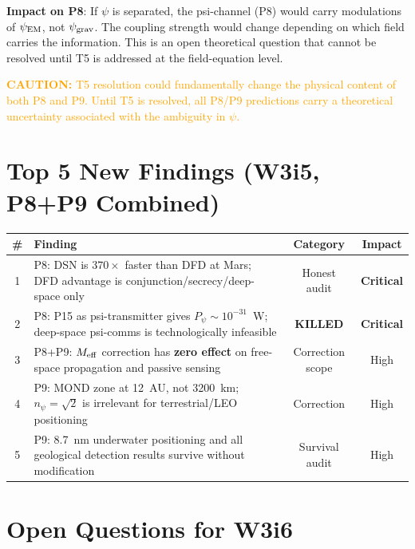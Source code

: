 \documentclass[aps,prd,twocolumn,superscriptaddress,nofootinbib]{revtex4-2}
\newcommand{\caution}[1]{\textcolor{orange}{\textbf{CAUTION:} #1}}
\begin{document}
\textbf{Impact on P8}: If $\psi$ is separated, the psi-channel (P8) would
carry modulations of $\psi_{\rm EM}$, not $\psi_{\rm grav}$. The
coupling strength would change depending on which field carries the
information. This is an open theoretical question that cannot be
resolved until T5 is addressed at the field-equation level.

\caution{T5 resolution could fundamentally change the physical content
of both P8 and P9. Until T5 is resolved, all P8/P9 predictions carry
a theoretical uncertainty associated with the ambiguity in $\psi$.}

\section{Top 5 New Findings (W3i5, P8+P9 Combined)}
\label{sec:top5}

\begin{center}
\begin{tabular}{clcc}
\toprule
\# & Finding & Category & Impact \\
\midrule
1 & P8: DSN is $370\times$ faster than DFD at Mars;
  DFD advantage is conjunction/secrecy/deep-space only
  & Honest audit & \textbf{Critical} \\
2 & P8: P15 as psi-transmitter gives $P_\psi \sim 10^{-31}$~W;
  deep-space psi-comms is technologically infeasible
  & \textbf{KILLED} & \textbf{Critical} \\
3 & P8+P9: $M_{\rm eff}$ correction has \textbf{zero effect}
  on free-space propagation and passive sensing
  & Correction scope & High \\
4 & P9: MOND zone at 12~AU, not 3200~km; $n_\psi = \sqrt{2}$
  is irrelevant for terrestrial/LEO positioning
  & Correction & High \\
5 & P9: 8.7~nm underwater positioning and all geological
  detection results survive without modification
  & Survival audit & High \\
\bottomrule
\end{tabular}
\end{center}

\section{Open Questions for W3i6}
\label{sec:open}
\end{document}
